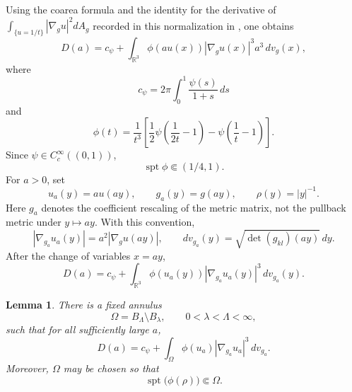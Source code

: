 \documentclass[11pt]{amsart}
\numberwithin{equation}{section}
\newtheorem{lemma}[theorem]{Lemma}
\theoremstyle{definition}
\newcommand{\R}{\mathbb R}
\newcommand{\spt}{\operatorname{spt}}
\newcommand{\rhoE}{\rho}
\newcommand{\abs}[1]{\left\lvert #1\right\rvert}
\begin{document}
Using the coarea formula and the identity for the derivative of $\int_{\{u=1/t\}}\abs{\nabla_g u}^2dA_g$ recorded in this normalization in \cite[Appendix~A, Proposition~25]{MYrigidity}, one obtains
\begin{equation}\label{eq:D-unscaled-integral}
        D(a)=c_\psi+\int_{\R^3}\phi(au(x))\abs{\nabla_g u(x)}^3a^3\,dv_g(x),
\end{equation}
where
\begin{equation}\label{eq:c-psi}
        c_\psi=2\pi\int_0^1\frac{\psi(s)}{1+s}\,ds
\end{equation}
and
\begin{equation}\label{eq:phi-def}
        \phi(t)=\frac1{t^3}\left[\frac12\psi\left(\frac1{2t}-1\right)-\psi\left(\frac1t-1\right)\right].
\end{equation}
Since $\psi\in C_c^\infty((0,1))$,
\begin{equation}\label{eq:phi-support}
        \spt\phi\Subset(1/4,1).
\end{equation}
For $a>0$, set
$$
        u_a(y)=a u(ay),
        \qquad g_a(y)=g(ay),
        \qquad \rhoE(y)=\abs y^{-1}.
$$
Here $g_a$ denotes the coefficient rescaling of the metric matrix, not the pullback metric under $y\mapsto ay$.  With this convention,
$$
        |\nabla_{g_a}u_a(y)|=a^2|\nabla_g u(ay)|,
        \qquad
        dv_{g_a}(y)=\sqrt{\det(g_{kl})(ay)}\,dy.
$$
After the change of variables $x=ay$,
\begin{equation}\label{eq:D-rescaled-allspace}
        D(a)=c_\psi+\int_{\R^3}\phi(u_a(y))\abs{\nabla_{g_a}u_a(y)}^3\,dv_{g_a}(y).
\end{equation}

\begin{lemma}\label{lem:fixed-annulus}
There is a fixed annulus
$$
        \Omega=B_\Lambda\setminus B_\lambda,
        \qquad 0<\lambda<\Lambda<\infty,
$$
such that for all sufficiently large $a$,
\begin{equation}\label{eq:D-fixed-annulus}
        D(a)=c_\psi+\int_{\Omega}\phi(u_a)\abs{\nabla_{g_a}u_a}^3\,dv_{g_a}.
\end{equation}
Moreover, $\Omega$ may be chosen so that
\begin{equation}\label{eq:rho-support-in-omega}
        \spt\bigl(\phi(\rhoE)\bigr)\Subset\Omega.
\end{equation}
\end{lemma}
\end{document}
